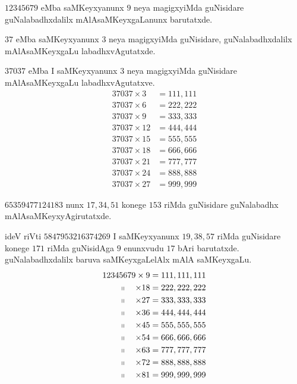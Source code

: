 $12345679$ eMba saMKeyxyanunx $9$ neya magigxyiMda guNisidare guNalabadhxdalilx mAlAsaMKeyxgaLanunx barutatxde.

$37$ eMba saMKeyxyanunx $3$ neya magigxyiMda guNisidare, guNalabadhxdalilx mAlAsaMKeyxgaLu labadhxvAgutatxde.

$37037$ eMba I saMKeyxyanunx $3$ neya magigxyiMda guNisidare \-mAlAsaMKeyxgaLu labadhxvAgutatxve.
\begin{align*}
37037 \times  3&= 111,111 \\
37037 \times  6&= 222,222\\
37037 \times  9&= 333,333\\
37037 \times  12&= 444,444\\
37037 \times  15&= 555,555\\
37037 \times  18&= 666,666\\
37037 \times  21&= 777,777\\
37037 \times  24&= 888,888\\
37037 \times  27&= 999,999
\end{align*}

$65359477124183$ nunx $17,34,51$ konege $153$ riMda guNisidare guNalabadhx mAlAsaMKeyxyAgirutatxde.

ideV riVti $5847953216374269$ I saMKeyxyanunx $19,38,57$ riMda guNisidare konege $171$ riMda guNisidAga $9$ enunxvudu $17$ bAri barutatxde. guNalabadhxdalilx baruva saMKeyxgaLelAlx mAlA saMKeyxgaLu.
\begin{align*}
12345679             \times                 9 &= 111,111,111\\
~~~~\shortparallel~~~\times                18 &=222,222,222\\
~~~~\shortparallel~~~\times                27 &=333,333,333 \\
~~~~\shortparallel~~~\times                36 &=444,444,444  \\
~~~~\shortparallel~~~\times                45 &=555,555,555 \\
~~~~\shortparallel~~~\times                54 &=666,666,666 \\
~~~~\shortparallel~~~\times                63 &= 777,777,777\\
~~~~\shortparallel~~~\times                72 &= 888,888,888\\
~~~~\shortparallel~~~\times                 81 &= 999,999,999\\
\end{align*}
